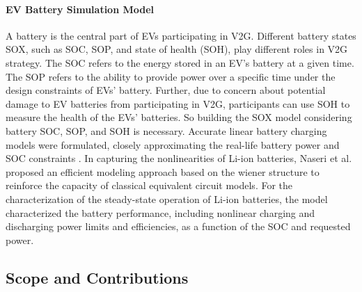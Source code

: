\documentclass[journal,twoside]{IEEEtran}
\begin{document}
\paragraph{EV Battery Simulation Model}
A battery is the central part of EVs participating in V2G. Different battery states SOX, such as SOC, SOP, and state of health (SOH), play different roles in V2G strategy\cite{shrivastava2023review}. The SOC refers to the energy stored in an EV's battery at a given time. The SOP refers to the ability to provide power over a specific time under the design constraints of EVs' battery. Further, due to concern about potential damage to EV batteries from participating in V2G, participants can use SOH to measure the health of the EVs' batteries. So building the SOX model considering battery SOC, SOP, and SOH is necessary. Accurate linear battery charging models were formulated, closely approximating the real-life battery power and SOC constraints \cite{pandvzic2018accurate, sakti2017enhanced}. In capturing the nonlinearities of Li-ion batteries, Naseri et al. proposed an efficient modeling approach based on the wiener structure to reinforce the capacity of classical equivalent circuit models\cite{naseri2021enhanced}. For the characterization of the steady-state operation of Li-ion batteries, the model characterized the battery performance, including nonlinear charging and discharging power limits and efficiencies, as a function of the SOC and requested power\cite{gonzalez2019non}.

\subsection{Scope and Contributions}
\end{document}

